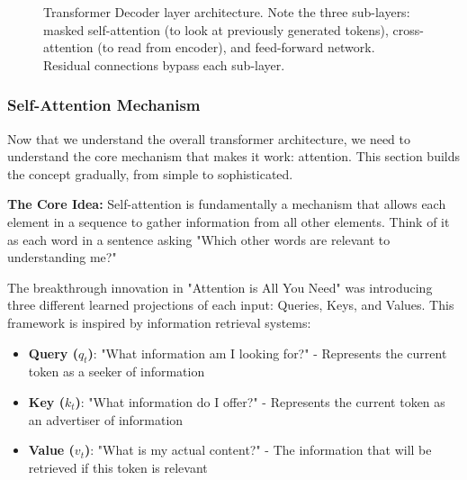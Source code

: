 \begin{enumerate}
\begin{figure}[h!]
  \caption{Transformer Decoder layer architecture. Note the three sub-layers: masked self-attention (to look at previously generated tokens), cross-attention (to read from encoder), and feed-forward network. Residual connections bypass each sub-layer.}
  \label{fig:decoder}
\end{figure}
\end{enumerate}

\subsubsection{Self-Attention Mechanism}
Now that we understand the overall transformer architecture, we need to understand the
core mechanism that makes it work: attention. This section builds the concept gradually,
from simple to sophisticated.

\textbf{The Core Idea:} Self-attention is fundamentally a mechanism that allows each element in a sequence to
gather information from all other elements. Think of it as each word in a sentence asking
"Which other words are relevant to understanding me?"

The breakthrough innovation in "Attention is All You Need" \cite{vaswani2017attention} was introducing three different learned projections of each input: Queries, Keys, and Values. This framework is inspired by information retrieval systems:

\begin{itemize}
  \item \textbf{Query ($q_t$)}: "What information am I looking for?" - Represents the current token as a seeker of information
  \item \textbf{Key ($k_t$)}: "What information do I offer?" - Represents the current token as an advertiser of information
  \item \textbf{Value ($v_t$)}: "What is my actual content?" - The information that will be retrieved if this token is relevant
\end{itemize}

